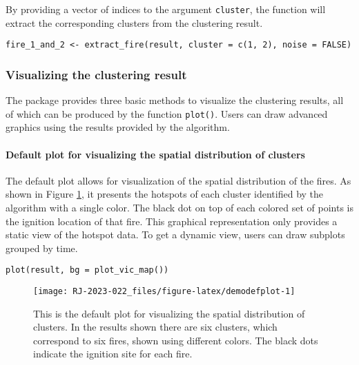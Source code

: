 By providing a vector of indices to the argument \texttt{cluster}, the function will extract the corresponding clusters from the clustering result.

\begin{verbatim}
fire_1_and_2 <- extract_fire(result, cluster = c(1, 2), noise = FALSE)
\end{verbatim}

\hypertarget{visualizing-the-clustering-result}{%
\subsubsection{Visualizing the clustering result}\label{visualizing-the-clustering-result}}

The package provides three basic methods to visualize the clustering results, all of which can be produced by the function \texttt{plot()}. Users can draw advanced graphics using the results provided by the algorithm.

\hypertarget{default-plot-for-visualizing-the-spatial-distribution-of-clusters}{%
\paragraph{Default plot for visualizing the spatial distribution of clusters}\label{default-plot-for-visualizing-the-spatial-distribution-of-clusters}}

The default plot allows for visualization of the spatial distribution of the fires. As shown in Figure \ref{fig:demodefplot}, it presents the hotspots of each cluster identified by the algorithm with a single color. The black dot on top of each colored set of points is the ignition location of that fire.
This graphical representation only provides a static view of the hotspot data. To get a dynamic view, users can draw subplots grouped by time.

\begin{verbatim}
plot(result, bg = plot_vic_map())
\end{verbatim}

\begin{figure}

{\centering \texttt{[image: RJ-2023-022\_files/figure-latex/demodefplot-1]} 

}

\caption{This is the default plot for visualizing the spatial distribution of clusters. In the results shown there are six clusters, which correspond to six fires, shown using different colors. The black dots indicate the ignition site for each fire.}\label{fig:demodefplot}
\end{figure}

